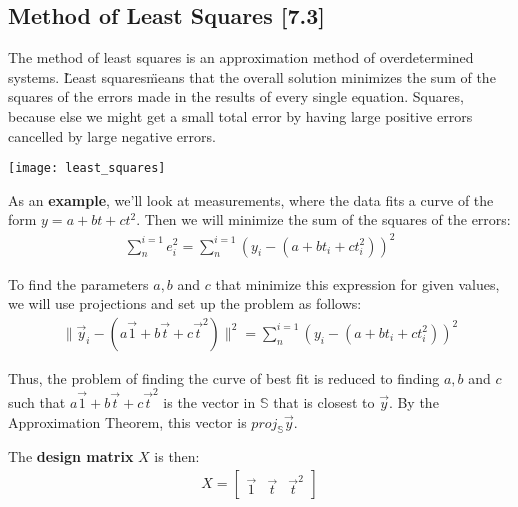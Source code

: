 \documentclass[a4paper,9pt]{extarticle}
\begin{document}
\begin{multicols*}{2}

\subsection{Method of Least Squares [7.3]}
The method of least squares is an approximation method of overdetermined systems. \"Least squares\" means that the overall solution minimizes the sum of the squares of the errors made in the results of every single equation. Squares, because else we might get a small total error by having large positive errors cancelled by large negative errors.

{\centering \texttt{[image: least\_squares]} \par}

As an \textbf{example}, we'll look at measurements, where the data fits a curve of the form $y = a + bt + ct^2$. Then we will minimize the sum of the squares of the errors:
\begin{equation} \label{7.3-1}
    \begin{split}
        \sum_{n}^{i = 1} e_i^2 = \sum_{n}^{i = 1} (y_i - (a + bt_i + ct_i^2))^2
    \end{split}
\end{equation}

To find the parameters $a, b$ and $c$ that minimize this expression for given values, we will use projections and set up the problem as follows:
\begin{equation} \label{7.3-2}
    \begin{split}
        \|\vec{y}_i - (a\vec{1} + b\vec{t} + c\vec{t}^2)\|^2 = \sum_{n}^{i = 1} (y_i - (a + bt_i + ct_i^2))^2
    \end{split}
\end{equation}

Thus, the problem of finding the curve of best fit is reduced to finding $a, b$ and $c$ such that $a\vec{1} + b\vec{t} + c\vec{t}^2$ is the vector in $\mathbb{S}$ that is closest to $\vec{y}$. By the Approximation Theorem, this vector is $proj_{\mathbb{S}} \vec{y}$.

The \textbf{design matrix} $X$ is then:
\begin{equation} \label{7.3-3}
    \begin{split}
        X = \begin{bmatrix}\vec{1} & \vec{t} & \vec{t}^2\end{bmatrix}
    \end{split}
\end{equation}


\end{multicols*}
\end{document}
